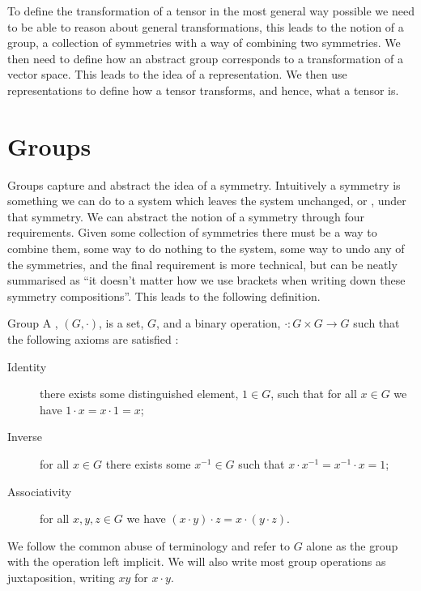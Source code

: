 \documentclass[fleqn]{NotesClass}
\newcommand{\identity}{1}
\begin{document}
    To define the transformation of a tensor in the most general way possible we need to be able to reason about general transformations, this leads to the notion of a group, a collection of symmetries with a way of combining two symmetries.
    We then need to define how an abstract group corresponds to a transformation of a vector space.
    This leads to the idea of a representation.
    We then use representations to define how a tensor transforms, and hence, what a tensor is.
    
    \section{Groups}
    Groups capture and abstract the idea of a symmetry.
    Intuitively a symmetry is something we can do to a system which leaves the system unchanged, or , under that symmetry.
    We can abstract the notion of a symmetry through four requirements.
    Given some collection of symmetries there must be a way to combine them, some way to do nothing to the system, some way to undo any of the symmetries, and the final requirement is more technical, but can be neatly summarised as \enquote{it doesn't matter how we use brackets when writing down these symmetry compositions}.
    This leads to the following definition.
    
    \begin{dfn}{Group}{}
        A , \((G, \cdot)\), is a set, \(G\), and a binary operation, \(\cdot \colon G \times G \to G\) such that the following axioms are satisfied \cite[1043]{riley-hobson-bence}:
        \begin{description}
            \item[Identity] there exists some distinguished element, \(\identity \in G\), such that for all \(x \in G\) we have \(\identity \cdot x = x \cdot \identity = x\);
            \item[Inverse] for all \(x \in G\) there exists some \(x^{-1} \in G\) such that \(x \cdot x^{-1} = x^{-1} \cdot x = \identity\);
            \item[Associativity] for all \(x, y, z \in G\) we have \((x \cdot y) \cdot z = x \cdot (y \cdot z)\).
        \end{description}
    \end{dfn}
    
    We follow the common abuse of terminology and refer to \(G\) alone as the group with the operation left implicit.
    We will also write most group operations as juxtaposition, writing \(xy\) for \(x \cdot y\).
    
\end{document}
